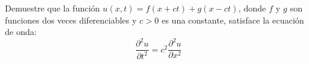 Demuestre que la función $u(x, t) = f(x + ct) + g(x - ct)$, donde $f$ y $g$ son funciones dos veces diferenciables y $c > 0$ es una constante, satisface la ecuación de onda:
\[
\frac{\partial^2 u}{\partial t^2} = c^2 \frac{\partial^2 u}{\partial x^2}
\]
